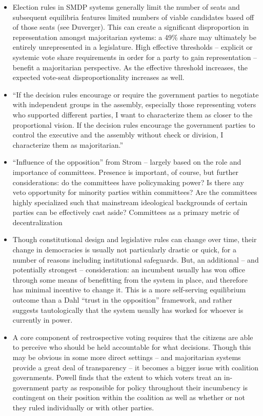 \documentclass[12pt]{article}
\begin{document}
\begin{itemize}[leftmargin=*, itemsep=4pt]
    \item Election rules in SMDP systems generally limit the number of seats and subsequent equilibria features limited numbers of viable candidates based off of those seats (see Duverger). This can create a significant disproportion in representation amongst majoritarian systems: a 49\% share may ultimately be entirely unrepresented in a legislature. High effective thresholds -- explicit or systemic vote share requirements in order for a party to gain representation -- benefit a majoritarian perspective. As the effective threshold increases, the expected vote-seat disproportionality increases as well.
    \item ``If the decision rules encourage or require the government parties to negotiate with independent groups in the assembly, especially those representing voters who supported different parties, I want to characterize them as closer to the proportional vision. If the decision rules encourage the government parties to control the executive and the assembly without check or division, I characterize them as majoritarian.''
    \item ``Influence of the opposition'' from Strom -- largely based on the role and importance of committees. Presence is important, of course, but further considerations: do the committees have policymaking power? Is there any veto opportunity for minority parties within committees? Are the committees highly specialized such that mainstream ideological backgrounds of certain parties can be effectively cast aside? Committees as a primary metric of decentralization
    \item Though constitutional design and legislative rules can change over time, their change in democracies is usually not particularly drastic or quick, for a number of reasons including institutional safeguards. But, an additional -- and potentially strongest -- consideration: an incumbent usually has won office through some means of benefitting from the system in place, and therefore has minimal incentive to change it. This is a more self-serving equilibrium outcome than a Dahl ``trust in the opposition'' framework, and rather suggests tautologically that the system usually has worked for whoever is currently in power.
    \item A core component of restrospective voting requires that the citizens are able to perceive who should be held accountable for what decisions. Though this may be obvious in some more direct settings -- and majoritarian systems provide a great deal of transparency -- it becomes a bigger issue with coalition governments. Powell finds that the extent to which voters treat an in-government party as responsible for policy throughout their incumbency is contingent on their position within the coalition as well as whether or not they ruled individually or with other parties.

\end{itemize}
\end{document}
